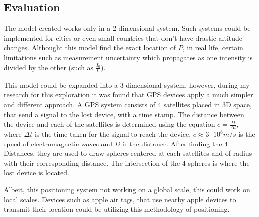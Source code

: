 \documentclass[a4paper,12pt]{article}
\begin{document}
\subsection{Evaluation}
The model created works only in a 2 dimensional system. Such systems could be implemented for cities or even small countries that don't have drastic altitude changes. Althought this model find the exact location 
of $P$, in real life, certain limitations such as measurement uncertainty which propagates as one intensity is divided by the other (such as $\frac{I_0}{I_1}$).

This model could be expanded into a 3 dimensional system, however, during my research for this exploration it was found that GPS devices apply a much simpler and different approach. A GPS system consists of 4 satellites placed in 3D space,
that send a signal to the lost device, with a time stamp. The distance between the device and each of the satellites is determined using the equation $c=\frac{D}{\Delta t}$, where $\Delta t$ is the time taken for the signal to reach the device, $c\approx 3\cdot 10^8 m/s$ is the speed of electromagnetic waves and $D$ is the distance.
After finding the 4 Distances, they are used to draw spheres centered at each satellites and of radius with their corresponding distance. The intersection of the 4 spheres is where the lost device is located.

Albeit, this positioning system not working on a global scale, this could work on local scales. Devices such as apple air tags, that use nearby apple devices to transmit their location could be utilizing this methodology of positioning.

\printbibliography
\end{document}
